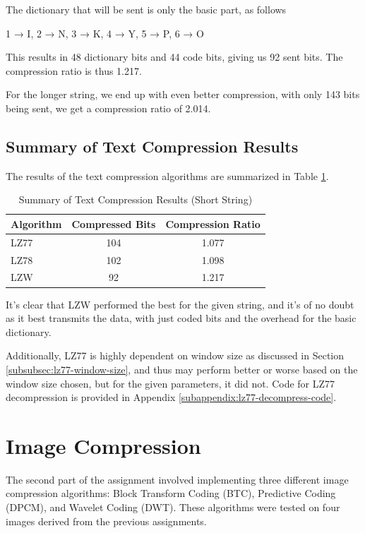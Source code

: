 \documentclass[12pt, a4paper]{AnantDocumentation}
\begin{document}
The dictionary that will be sent is only the basic part, as follows
\begin{center}
  1 → I,
  2 → N,
  3 → K,
  4 → Y,
  5 → P,
  6 → O
\end{center}

This results in 48 dictionary bits and 44 code bits, giving us 92 sent bits. The compression ratio is thus 1.217.

For the longer string, we end up with even better compression, with only 143 bits being sent, we get a compression ratio of 2.014.

\subsection{Summary of Text Compression Results}
\label{subsec:text-compression-summary}
The results of the text compression algorithms are summarized in Table \ref{tab:text-compression-summary}.
\begin{table}[h!]
	\centering
	\begin{tabular}{lcc}
		\toprule
		Algorithm & Compressed Bits & Compression Ratio \\
		\midrule
		LZ77 & 104 & 1.077 \\
		LZ78 & 102 & 1.098 \\
		LZW & 92 & 1.217 \\
		\bottomrule
	\end{tabular}
	\caption{Summary of Text Compression Results (Short String)}
	\label{tab:text-compression-summary}
\end{table}

It's clear that LZW performed the best for the given string, and it's of no doubt as it best transmits the data, with just coded bits and the overhead for the basic dictionary.

Additionally, LZ77 is highly dependent on window size as discussed in Section \ref{subsubsec:lz77-window-size}, and thus may perform better or worse based on the window size chosen, but for the given parameters, it did not. Code for LZ77 decompression is provided in Appendix \ref{subappendix:lz77-decompress-code}.

\section{Image Compression}
\label{sec:image-compression}
The second part of the assignment involved implementing three different image compression algorithms: Block Transform Coding (BTC), Predictive Coding (DPCM), and Wavelet Coding (DWT). These algorithms were tested on four images derived from the previous assignments.
\end{document}
